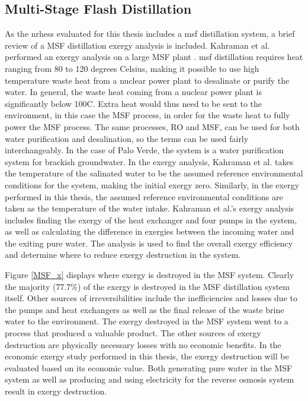 \subsection{Multi-Stage Flash Distillation}
As the \ac{nrhess} evaluated for this thesis includes a \ac{msf} distillation system, a brief review of a MSF distillation exergy analysis is included. Kahraman et al. performed an exergy analysis on a large MSF plant \cite{Kahraman2005}.  \ac{msf} distillation requires heat ranging from 80 to 120 degrees Celsius, making it possible to use high temperature waste heat from a nuclear power plant to desalinate or purify the water. In general, the waste heat coming from a nuclear power plant is significantly below 100\degree C. Extra heat would thus need to be sent to the environment, in this case the MSF process, in order for the waste heat to fully power the MSF process. The same processes, RO and MSF, can be used for both water purification and desalination, so the terms can be used fairly interchangeably. In the case of Palo Verde, the system is a water purification system for brackish groundwater. In the exergy analysis, Kahraman et al. takes the temperature of the salinated water to be the assumed reference environmental conditions for the system, making the initial exergy zero. Similarly, in the exergy performed in this thesis, the assumed reference environmental conditions are taken as the temperature of the water intake. Kahraman et al.'s exergy analysis includes finding the exergy of the heat exchanger and four pumps in the system, as well as calculating the difference in exergies between the incoming water and the exiting pure water. The analysis is used to find the overall exergy efficiency and determine where to reduce exergy destruction in the system.

Figure \ref{MSF_x} displays where exergy is destroyed in the MSF system. Clearly the majority (77.7\%) of the exergy is destroyed in the MSF distillation system itself. Other sources of irreversibilities include the inefficiencies and losses due to the pumps and heat exchangers as well as the final release of the waste brine water to the environment. The exergy destroyed in the MSF system went to a process that produced a valuable product.  The other sources of exergy destruction are physically necessary losses with no economic benefits. In the economic exergy study performed in this thesis, the exergy destruction will be evaluated based on its economic value.  Both generating pure water in the MSF system as well as producing and using electricity for the reverse osmosis system result in exergy destruction.

